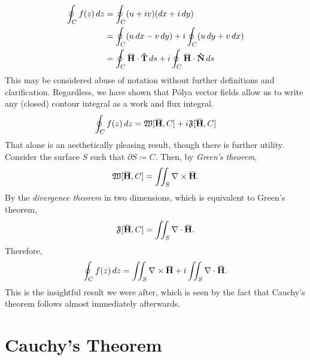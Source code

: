 \documentclass[a4paper]{article}
\newcommand*\diff{\mathop{}\!d} %
\newcommand{\overbar}[1]{\mkern 1.5mu\overline{\mkern-1.5mu#1\mkern-1.5mu}\mkern 1.5mu}
\theoremstyle{definition}
\begin{document}
\begin{align*}
    \oint_C f(z) \diff z & = \oint_C (u + iv) (\diff x + i \diff y)                                                                                      \\
                         & = \oint_C (u \diff x - v \diff y) + i \oint_C (u \diff y + v \diff x)                                                         \\
                         & = \oint_C \mathbf{\overbar{H}} \cdot \mathbf{\hat{T}} \diff s + i \oint_C \mathbf{\overbar{H}} \cdot \mathbf{\hat{N}} \diff s
\end{align*}
This may be considered abuse of notation without further definitions and clarification.
Regardless, we have shown that P\'olya vector fields allow us to write any (closed) contour integral as a work and flux integral.
\begin{equation} \label{eq:work-flux}
    \oint_C f(z) \diff z = \mathfrak{W}[\mathbf{\overbar{H}}, C] + i \mathfrak{F}[\mathbf{\overbar{H}}, C]
\end{equation}
That alone is an aesthetically pleasing result, though there is further utility.
Consider the surface $S$ such that $\partial S \coloneq C$.
Then, by \emph{Green's theorem},
\begin{equation*}
    \mathfrak{W}[\mathbf{\overbar{H}}, C] = \iint_S \nabla \times \mathbf{\overbar{H}}.
\end{equation*}
By the \emph{divergence theorem} in two dimensions, which is equivalent to Green's theorem,
\begin{equation*}
    \mathfrak{F}[\mathbf{\overbar{H}}, C] = \iint_S \nabla \cdot \mathbf{\overbar{H}}.
\end{equation*}
Therefore,
\begin{equation}
    \oint_C f(z) \diff z = \iint_S \nabla \times \mathbf{\overbar{H}} + i \iint_S \nabla \cdot \mathbf{\overbar{H}}.
\end{equation}
This is the insightful result we were after, which is seen by the fact that Cauchy's theorem follows almost immediately afterwards.

\section{Cauchy's Theorem}
\end{document}

